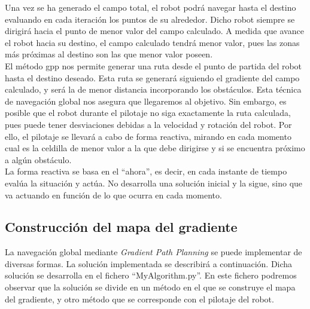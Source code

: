 Una vez se ha generado el campo total, el robot podrá navegar hasta el destino evaluando en cada iteración los puntos de su alrededor. Dicho robot siempre se dirigirá hacia el punto de menor valor del campo calculado. A medida que avance el robot hacia su destino, el campo calculado tendrá menor valor, pues las zonas más próximas al destino son las que menor valor poseen.  \\

El método \acrshort{gpp} nos permite generar una ruta desde el punto de partida del robot hasta el destino deseado. Esta ruta se generará siguiendo el gradiente del campo calculado, y será la de menor distancia incorporando los obstáculos. Esta técnica de navegación global nos asegura que llegaremos al objetivo. Sin embargo, es posible que el robot durante el pilotaje no siga exactamente la ruta calculada, pues puede tener desviaciones debidas a la velocidad y rotación del robot. Por ello, el pilotaje se llevará a cabo de forma reactiva, mirando en cada momento cual es la celdilla de menor valor a la que debe dirigirse y si se encuentra próximo a algún obstáculo.\\

La forma reactiva se basa en el ``ahora'', es decir, en cada instante de tiempo evalúa la situación y actúa. No desarrolla una solución inicial y la sigue, sino que va actuando en función de lo que ocurra en cada momento.

\subsection{Construcción del mapa del gradiente}
La navegación global mediante \textit{Gradient Path Planning} se puede implementar de diversas formas. La solución implementada se describirá a continuación. Dicha solución se desarrolla en el fichero ``MyAlgorithm.py''. En este fichero podremos observar que la solución se divide en un método en el que se construye el mapa del gradiente, y otro método que se corresponde con el pilotaje del robot.\\

